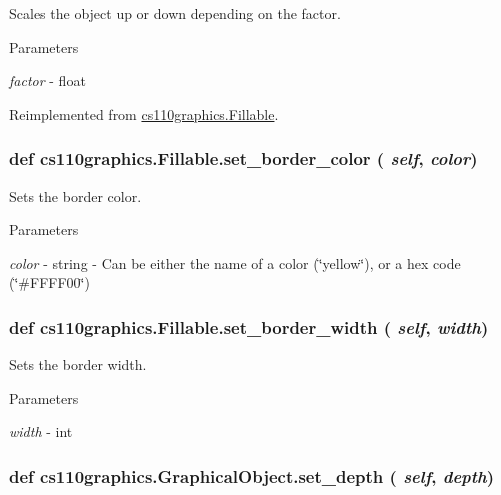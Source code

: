 Scales the object up or down depending on the factor. 
\begin{DoxyParams}{Parameters}
\item[{\em factor}]-\/ float \end{DoxyParams}


Reimplemented from \hyperlink{classcs110graphics_1_1Fillable_a80d5b6b6d2ebae867dccecb803075749}{cs110graphics.Fillable}.\hypertarget{classcs110graphics_1_1Fillable_a2f830be5d970faac97759910d20d68a4}{
\subsubsection[{set\_\-border\_\-color}]{\setlength{\rightskip}{0pt plus 5cm}def cs110graphics.Fillable.set\_\-border\_\-color ( {\em self}, \/   {\em color})}}
\label{classcs110graphics_1_1Fillable_a2f830be5d970faac97759910d20d68a4}


Sets the border color. 
\begin{DoxyParams}{Parameters}
\item[{\em color}]-\/ string -\/ Can be either the name of a color (\char`\"{}yellow\char`\"{}), or a hex code (\char`\"{}\#FFFF00\char`\"{}) \end{DoxyParams}
\hypertarget{classcs110graphics_1_1Fillable_a09f05462cb2ed38fdccb244340f05b2b}{
\subsubsection[{set\_\-border\_\-width}]{\setlength{\rightskip}{0pt plus 5cm}def cs110graphics.Fillable.set\_\-border\_\-width ( {\em self}, \/   {\em width})}}
\label{classcs110graphics_1_1Fillable_a09f05462cb2ed38fdccb244340f05b2b}


Sets the border width. 
\begin{DoxyParams}{Parameters}
\item[{\em width}]-\/ int \end{DoxyParams}
\hypertarget{classcs110graphics_1_1GraphicalObject_a20d76d4ee4419c3065d61deb6cbc6700}{
\subsubsection[{set\_\-depth}]{\setlength{\rightskip}{0pt plus 5cm}def cs110graphics.GraphicalObject.set\_\-depth ( {\em self}, \/   {\em depth})}}
\label{classcs110graphics_1_1GraphicalObject_a20d76d4ee4419c3065d61deb6cbc6700}


